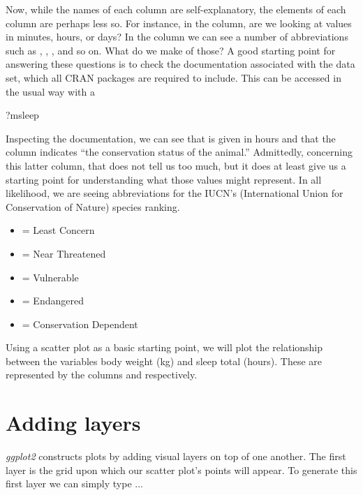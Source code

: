 Now, while the names of each column are self-explanatory, the elements of each column are perhaps less so.  For instance, in the  column, are we looking at values in minutes, hours, or days? In the  column we can see a number of abbreviations such as , , , and so on. What do we make of those? A good starting point for answering these questions is to check the documentation associated with the data set, which all CRAN packages are required to include. This can be accessed in the usual way with a 

\begin{inR}
?msleep
\end{inR}
\vspace{1em}

\noindent
Inspecting the documentation, we can see that  is given in hours and that the column  indicates ``the conservation status of the animal.''  Admittedly, concerning this latter column, that does not tell us too much, but it does at least give us a starting point for understanding what those values might represent.  In all likelihood, we are seeing abbreviations for the IUCN's (International Union for Conservation of Nature) species ranking. 

\begin{itemize}
\setlength\itemsep{-1em}
    \item {} = Least Concern
    \item {} = Near Threatened
    \item {} = Vulnerable
    \item {} = Endangered
    \item {} = Conservation Dependent
\end{itemize}

Using a \gls{scatter plot} as a basic starting point, we will plot the relationship between the variables body weight (kg) and sleep total (hours).  These are represented by the columns  and  respectively. 

\section{Adding layers}

\textit{ggplot2} constructs plots by adding visual layers on top of one another. The first layer is the grid upon which our scatter plot's points will appear.  To generate this first layer we can simply type ...

